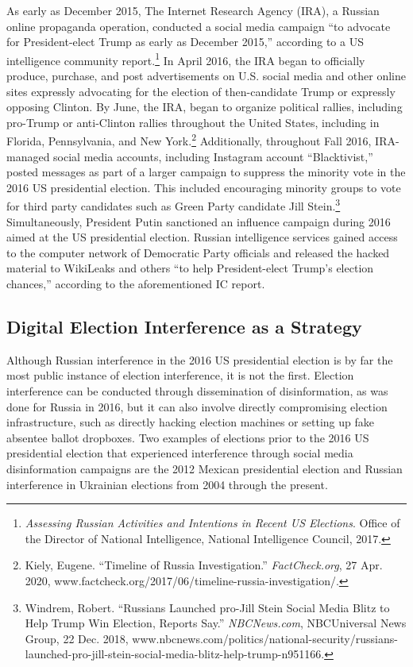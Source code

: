\documentclass[10pt, letterpaper]{article}
\begin{document}
As early as December 2015, The Internet Research Agency (IRA), a Russian
online propaganda operation, conducted a social media campaign ``to
advocate for President-elect Trump as early as December 2015,''
according to a US intelligence community report.\footnote{\emph{Assessing
  Russian Activities and Intentions in Recent US Elections}. Office of
  the Director of National Intelligence, National Intelligence Council,
  2017.} In April 2016, the IRA began to officially produce, purchase,
and post advertisements on U.S. social media and other online sites
expressly advocating for the election of then-candidate Trump or
expressly opposing Clinton. By June, the IRA, began to organize
political rallies, including pro-Trump or anti-Clinton rallies
throughout the United States, including in Florida, Pennsylvania, and
New York.\footnote{Kiely, Eugene. ``Timeline of Russia Investigation.''
  \emph{FactCheck.org}, 27 Apr. 2020,
  www.factcheck.org/2017/06/timeline-russia-investigation/.}
Additionally, throughout Fall 2016, IRA-managed social media accounts,
including Instagram account ``Blacktivist,'' posted messages as part of
a larger campaign to suppress the minority vote in the 2016 US
presidential election. This included encouraging minority groups to vote
for third party candidates such as Green Party candidate Jill
Stein.\footnote{Windrem, Robert. ``Russians Launched pro-Jill Stein
  Social Media Blitz to Help Trump Win Election, Reports Say.''
  \emph{NBCNews.com}, NBCUniversal News Group, 22 Dec. 2018,
  www.nbcnews.com/politics/national-security/russians-launched-pro-jill-stein-social-media-blitz-help-trump-n951166.} \\

Simultaneously, President Putin sanctioned an influence campaign during
2016 aimed at the US presidential election. Russian intelligence
services gained access to the computer network of Democratic Party
officials and released the hacked material to WikiLeaks and others ``to
help President-elect Trump's election chances,'' according to the
aforementioned IC report. \\

\subsection{Digital Election Interference as a Strategy}

Although Russian interference in the 2016 US presidential election is by
far the most public instance of election interference, it is not the
first. Election interference can be conducted through dissemination of
disinformation, as was done for Russia in 2016, but it can also involve
directly compromising election infrastructure, such as directly hacking
election machines or setting up fake absentee ballot dropboxes. Two
examples of elections prior to the 2016 US presidential election that
experienced interference through social media disinformation campaigns
are the 2012 Mexican presidential election and Russian interference in
Ukrainian elections from 2004 through the present. \\
\end{document}
